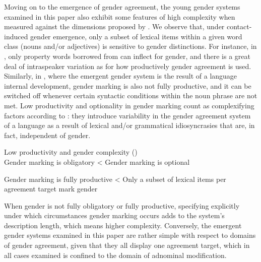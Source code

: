 \documentclass[output=collectionpaper]{langsci/langscibook}
\begin{document}
Moving on to the emergence of gender agreement, the young gender systems examined in this paper also exhibit some features of high complexity when measured against the dimensions proposed by \citet{Audring2017}.  We observe that, under contact-induced gender emergence, only a subset of lexical items within a given word class (nouns and/or adjectives) is sensitive to
gender distinctions. For instance, in , only property words borrowed from  can inflect for gender, and there is a great deal of intraspeaker variation as for how productively gender agreement is used. Similarly, in , where the emergent gender system is the result of a language internal development, gender marking is also not fully productive, and it can be switched off whenever certain syntactic conditions within the noun phrase are not met.  Low productivity and optionality in gender marking count as complexifying factors according to \citet{Audring2017}: they introduce variability in the gender agreement system of a language as a result of lexical and/or grammatical idiosyncrasies that are, in fact, independent of gender.


\ea\label{ex:dgm:13:Audring4}
Low productivity and gender complexity (\citealt{Audring2017})\\

\vspace{3mm}
Gender marking is obligatory {\textless} Gender marking is optional

\vspace{3mm}
Gender marking is fully productive  {\textless} Only a subset of lexical items per agreement target mark gender

\z

When gender is not fully obligatory or fully productive, specifying explicitly under which circumstances gender marking occurs adds to the system's description length, which means higher complexity. Conversely, the emergent gender systems examined in this paper are rather simple with respect to domains of gender agreement, given that they all display one agreement target, which in all cases examined is confined to the domain of adnominal modification.
\end{document}
